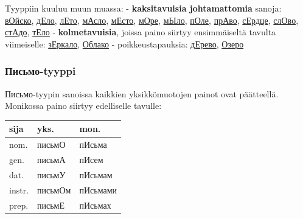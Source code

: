 \documentclass[]{scrreprt}
\begin{document}
Tyyppiin kuuluu muun muassa: - \textbf{kaksitavuisia johtamattomia}
sanoja:
\href{http://ru.wiktionary.org/wiki/\%D0\%B2\%D0\%BE\%D0\%B9\%D1\%81\%D0\%BA\%D0\%BE}{вОйско},
\href{http://ru.wiktionary.org/wiki/\%D0\%B4\%D0\%B5\%D0\%BB\%D0\%BE}{дЕло},
\href{http://ru.wiktionary.org/wiki/\%D0\%BB\%D0\%B5\%D1\%82\%D0\%BE}{лЕто},
\href{http://ru.wiktionary.org/wiki/\%D0\%BC\%D0\%B0\%D1\%81\%D0\%BB\%D0\%BE}{мАсло},
\href{http://ru.wiktionary.org/wiki/\%D0\%BC\%D0\%B5\%D1\%81\%D1\%82\%D0\%BE}{мЕсто},
\href{http://ru.wiktionary.org/wiki/\%D0\%BC\%D0\%BE\%D1\%80\%D0\%B5}{мОре},
\href{http://ru.wiktionary.org/wiki/\%D0\%BC\%D1\%8B\%D0\%BB\%D0\%BE}{мЫло},
\href{http://ru.wiktionary.org/wiki/\%D0\%BF\%D0\%BE\%D0\%BB\%D0\%B5}{пОле},
\href{http://ru.wiktionary.org/wiki/\%D0\%BF\%D1\%80\%D0\%B0\%D0\%B2\%D0\%BE}{прАво},
\href{http://ru.wiktionary.org/wiki/\%D1\%81\%D0\%B5\%D1\%80\%D0\%B4\%D1\%86\%D0\%B5}{сЕрдце},
\href{http://ru.wiktionary.org/wiki/\%D1\%81\%D0\%BB\%D0\%BE\%D0\%B2\%D0\%BE}{слОво},
\href{http://ru.wiktionary.org/wiki/\%D1\%81\%D1\%82\%D0\%B0\%D0\%B4\%D0\%BE}{стАдо},
\href{http://ru.wiktionary.org/wiki/\%D1\%82\%D0\%B5\%D0\%BB\%D0\%BE}{тЕло}
- \textbf{kolmetavuisia}, joissa paino siirtyy ensimmäiseltä tavulta
viimeiselle:
\href{http://ru.wiktionary.org/wiki/\%D0\%B7\%D0\%B5\%D1\%80\%D0\%BA\%D0\%B0\%D0\%BB\%D0\%BE}{зЕркало},
\href{http://ru.wiktionary.org/wiki/\%D0\%BE\%D0\%B1\%D0\%BB\%D0\%B0\%D0\%BA\%D0\%BE}{Облако}
- poikkeustapauksia:
\href{http://ru.wiktionary.org/wiki/\%D0\%B4\%D0\%B5\%D1\%80\%D0\%B5\%D0\%B2\%D0\%BE}{дЕрево},
\href{http://ru.wiktionary.org/wiki/\%D0\%BE\%D0\%B7\%D0\%B5\%D1\%80\%D0\%BE}{Озеро}

\subsubsection{Письмо-tyyppi}\label{ux43fux438ux441ux44cux43cux43e-tyyppi}

Письмо-tyypin sanoissa kaikkien yksikkömuotojen painot ovat päätteellä.
Monikossa paino siirtyy edelliselle tavulle:

\begin{longtable}[c]{@{}lll@{}}
\toprule
sija & yks. & mon.\tabularnewline
\midrule
\endhead
nom. & письмО & пИсьма\tabularnewline
gen. & письмА & пИсем\tabularnewline
dat. & письмУ & пИсьмам\tabularnewline
instr. & письмОм & пИсьмами\tabularnewline
prep. & письмЕ & пИсьмах\tabularnewline
\bottomrule
\end{longtable}
\end{document}
